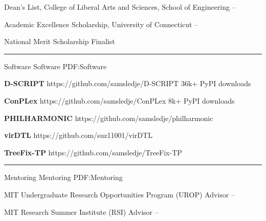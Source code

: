 \documentclass[letterpaper,MMMyyyy,nonstopmode]{simpleresumecv}
\begin{document}
\begin{Body}
\Entry
{Dean's List, College of Liberal Arts and Sciences, School of Engineering}
\hfill
{} --
\Gap

\Entry
{Academic Excellence Scholarship, University of Connecticut}
\hfill
{} -- 
\Gap




\Entry
{National Merit Scholarship Finalist}
\hfill
{}

\BigGap
\hrule
\Section
{Software}
{Software}
{PDF:Software}

\Entry
{\textbf{D-SCRIPT}}
\hfill https://github.com/samsledje/D-SCRIPT
\Gap
\Item
36k+ PyPI downloads
\BigGap

\Entry
{\textbf{ConPLex}}
\hfill https://github.com/samsledje/ConPLex
\Gap
\Item
8k+ PyPI downloads
\BigGap

\Entry
{\textbf{PHILHARMONIC}}
\hfill https://github.com/samsledje/philharmonic
\BigGap

\Entry
{\textbf{virDTL}}
\hfill https://github.com/suz11001/virDTL
\BigGap

\Entry
{\textbf{TreeFix-TP}}
\hfill https://github.com/samsledje/TreeFix-TP
\BigGap



\BigGap
\hrule
\Section
{Mentoring}
{Mentoring}
{PDF:Mentoring}

\Entry
{MIT Undergraduate Research Opportunities Program (UROP) Advisor}
\hfill
{} -- 
\Gap

\Entry
{MIT Research Summer Institute (RSI) Advisor}
\hfill
{} -- 
\Gap


\end{Body}
\end{document}
